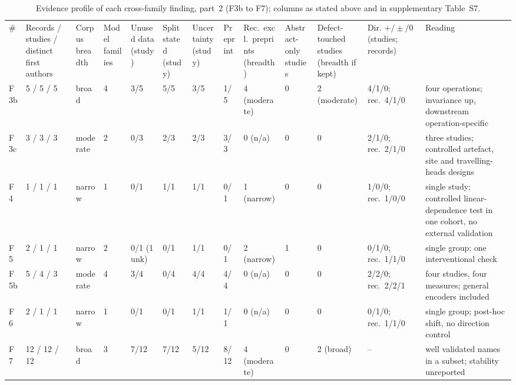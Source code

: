 \begin{table}
\centering\scriptsize\setlength\tabcolsep{2pt}\renewcommand{\arraystretch}{1.0}
\caption{Evidence profile of each cross-family finding, part~2 (F3b to F7); columns as stated above and in supplementary Table~S7.}
\label{tab:profileb}
\begin{tabular}{@{}L{0.75cm}C{1.35cm}C{1.5cm}C{0.9cm}C{1.05cm}C{1.15cm}C{1.05cm}C{1.55cm}C{1.05cm}C{1.6cm}C{1.45cm}C{1.1cm}L{3.3cm}@{}}
\toprule
\# & Records / studies / distinct first authors & Corpus breadth & Model families & Unused data (study) & Split stated (study) & Uncertainty (study) &  Preprint & Rec.\ excl.\ preprints (breadth) & Abstract-only studies & Defect-touched studies (breadth if kept) & Dir. $+/\pm/0$ (studies; records) & Reading \\
F3b & 5 / 5 / 5 & broad & 4 & 3/5 & 5/5 & 3/5 & 1/5 & 4 (moderate) & 0 & 2 (moderate) & 4/1/0; rec.\ 4/1/0 & four operations; invariance up, downstream operation-specific \\
F3c & 3 / 3 / 3 & moderate & 2 & 0/3 & 2/3 & 2/3 & 3/3 & 0 (n/a) & 0 & 0 & 2/1/0; rec.\ 2/1/0 & three studies; controlled artefact, site and travelling-heads designs \\
F4 & 1 / 1 / 1 & narrow & 1 & 0/1 & 1/1 & 1/1 & 0/1 & 1 (narrow) & 0 & 0 & 1/0/0; rec.\ 1/0/0 & single study; controlled linear-dependence test in one cohort, no external validation \\
F5 & 2 / 1 / 1 & narrow & 2 & 0/1 (1 unk) & 0/1 & 1/1 & 0/1 & 2 (narrow) & 1 & 0 & 0/1/0; rec.\ 1/1/0 & single group; one interventional check \\
F5b & 5 / 4 / 3 & moderate & 4 & 3/4 & 0/4 & 4/4 & 4/4 & 0 (n/a) & 0 & 0 & 2/2/0; rec.\ 2/2/1 & four studies, four measures; general encoders included \\
F6 & 2 / 1 / 1 & narrow & 1 & 0/1 & 0/1 & 1/1 & 1/1 & 0 (n/a) & 0 & 0 & 0/1/0; rec.\ 1/1/0 & single group; post-hoc shift, no direction control \\
F7 & 12 / 12 / 12 & broad & 3 & 7/12 & 7/12 & 5/12 & 8/12 & 4 (moderate) & 0 & 2 (broad) & -- & well validated names in a subset; stability unreported \\
\bottomrule
\end{tabular}
\end{table}
